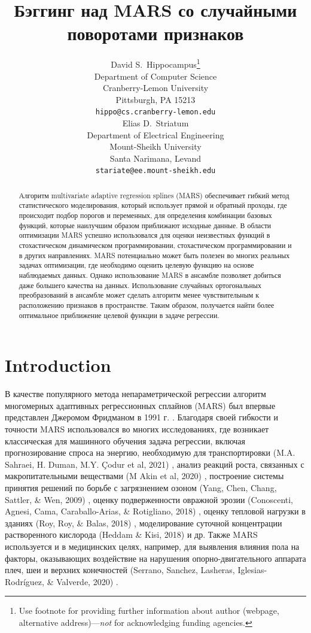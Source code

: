 \documentclass{article}
\title{Бэггинг над MARS со случайными поворотами признаков}
\author{ David S.~Hippocampus\thanks{Use footnote for providing further
		information about author (webpage, alternative
		address)---\emph{not} for acknowledging funding agencies.} \\
	Department of Computer Science\\
	Cranberry-Lemon University\\
	Pittsburgh, PA 15213 \\
	\texttt{hippo@cs.cranberry-lemon.edu} \\
	\And
	Elias D.~Striatum \\
	Department of Electrical Engineering\\
	Mount-Sheikh University\\
	Santa Narimana, Levand \\
	\texttt{stariate@ee.mount-sheikh.edu} \\
}
\date{}
\begin{document}
\maketitle


\begin{abstract}
Алгоритм multivariate adaptive regression splines (MARS) обеспечивает гибкий
метод статистического моделирования, который использует прямой и обратный проходы, где происходит подбор порогов и переменных, для определения комбинации
базовых функций, которые наилучшим образом приближают исходные данные.
В области оптимизации MARS успешно использовался для оценки неизвестных функций в стохастическом динамическом программировании, стохастическом программировании и в других направлениях. MARS потенциально может быть полезен во многих реальных задачах оптимизации, где необходимо оценить целевую функцию на основе наблюдаемых данных. Однако использование MARS в ансамбле позволяет добиться даже большего качества на данных. Использование случайных ортогональных преобразований в ансамбле может сделать алгоритм менее чувствительным к расположению признаков в пространстве. Таким образом, получается найти более оптимальное приближение целевой функции в задаче регрессии.
\end{abstract}



\section{Introduction}
В качестве популярного метода непараметрической регрессии алгоритм 
многомерных адаптивных регрессионных сплайнов (MARS) был впервые представлен Джеромом Фридманом в 1991 г. \cite{friedman1991multivariate}. Благодаря своей гибкости и точности MARS использовался во многих исследованиях, где возникает классическая для машинного обучения задача регрессии, включая прогнозирование спроса на энергию, необходимую для транспортировки (M.A. Sahraei, H. Duman, M.Y. Çodur et al, 2021) \cite{sahraei2021prediction}, анализ реакций роста, связанных с макропитательными веществами (M Akin et al, 2020) \cite{akin2020analysis}, построение системы принятия решений по борьбе с загрязнением озоном (Yang, Chen, Chang, Sattler, \& Wen, 2009) \cite{yang2009decision}, оценку подверженности овражной эрозии (Conoscenti, Agnesi, Cama, Caraballo-Arias, \& Rotigliano, 2018) \cite{conoscenti2018assessment}, оценку тепловой нагрузки в зданиях (Roy, Roy, \& Balas, 2018) \cite{roy2018estimating}, моделирование суточной концентрации растворенного кислорода (Heddam \& Kisi, 2018) \cite{heddam2018modelling} и др.
Также MARS используется и в медицинских целях, например, для выявления влияния пола на факторы, оказывающих воздействие на нарушения опорно-двигательного аппарата плеч, шеи и верхних конечностей
(Serrano, Sanchez, Lasheras, Iglesias-Rodríguez, \& Valverde, 2020) \cite{serrano2020identification}.
\end{document}
